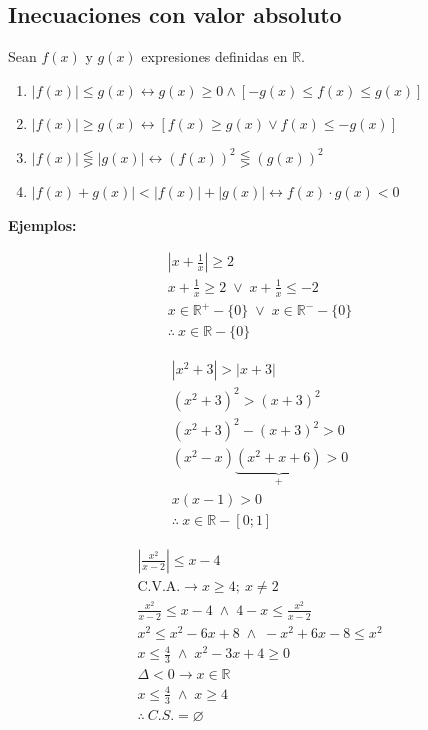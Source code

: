 \documentclass[11pt,a4paper]{article}
\newcommand{\cn}[1]{\raisebox{.5pt}{\textcircled{\raisebox{-.9pt}{\scriptsize #1}}}}
\begin{document}
\subsection*{Inecuaciones con valor absoluto}
Sean $f(x)$ y $g(x)$ expresiones definidas en $\mathbb{R}$.
\begin{enumerate}[label=\cn{\arabic*}]
  \item $|f(x)| \leq g(x) \longleftrightarrow g(x) \geq 0 \wedge [-g(x) \leq f(x) \leq g(x)]$
  \item $|f(x)| \geq g(x) \longleftrightarrow [f(x) \geq g(x) \vee f(x) \leq -g(x)]$
  \item $|f(x)| \lesseqgtr |g(x)| \longleftrightarrow (f(x))^2 \lesseqgtr (g(x))^2$
  \item $|f(x) + g(x)| < |f(x)| + |g(x)| \longleftrightarrow f(x)\cdot g(x) < 0$
\end{enumerate}

\textbf{Ejemplos:}

\begin{minipage}[t]{0.291\textwidth}
\begin{gather*}
\left|x + \frac{1}{x}\right| \geq 2\\
x + \frac{1}{x} \geq 2 \;\vee\; x + \frac{1}{x} \leq -2\\
x \in \mathbb{R}^+ - \{0\} \;\vee\; x \in \mathbb{R}^- - \{0\}\\
\therefore\ x \in \mathbb{R} - \{0\}
\end{gather*}
\end{minipage}\hfill
\begin{minipage}[t]{0.330\textwidth}
\begin{gather*}
|x^2 + 3| > |x + 3|\\
(x^2 + 3)^2 > (x + 3)^2\\
(x^2 + 3)^2 - (x + 3)^2 > 0\\
(x^2 - x)\underbrace{(x^2 + x + 6)}_{+} > 0\\
x(x - 1) > 0\\
\therefore\ x \in \mathbb{R} - [0; 1]
\end{gather*}
\end{minipage}\hfill
\begin{minipage}[t]{0.349\textwidth}\small
\begin{gather*}
\left|\frac{x^2}{x - 2}\right| \leq x - 4\\
\text{C.V.A.} \rightarrow x \geq 4;\ x \neq 2\\
\frac{x^2}{x-2} \leq x - 4 \;\wedge\; 4 - x \leq \frac{x^2}{x-2}\\
x^2 \leq x^2 - 6x + 8 \;\wedge\; -x^2 + 6x - 8 \leq x^2\\
x \leq \frac{4}{3} \;\wedge\; x^2 - 3x + 4 \geq 0\\
\Delta < 0 \rightarrow x \in \mathbb{R}\\
x \leq \frac{4}{3} \;\wedge\; x \geq 4\\
\therefore\ C.S. = \varnothing
\end{gather*}
\end{minipage}
\end{document}
